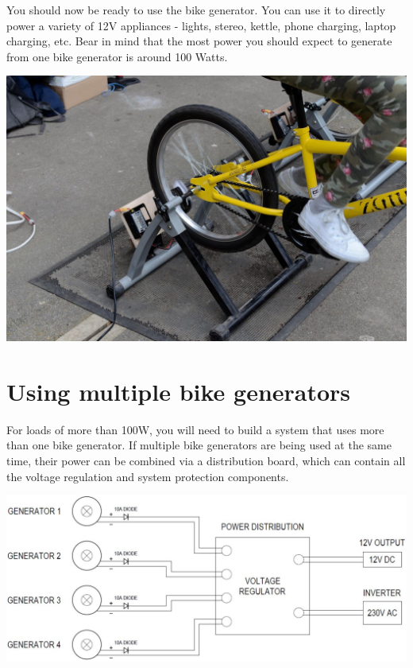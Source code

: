 \documentclass{article}
\theoremstyle{definition}
\theoremstyle{definition}
\theoremstyle{remark}
\begin{document}
  You should now be ready to use the bike generator. You can use it to directly power a variety of 12V appliances - lights, stereo, kettle, phone charging, laptop charging, etc. Bear in mind that the most power you should expect to generate from one bike generator is around 100 Watts.

  \begin{center}
    \includegraphics[width=0.45\paperwidth]{../Images/image_4_4_(generator_for_use).png}
  \end{center}


\section{Using multiple bike generators} %
\label{sec:using_multiple_bike_generators}

  For loads of more than 100W, you will need to build a system that uses more than one bike generator. If multiple bike generators are being used at the same time, their power can be combined via a distribution board, which can contain all the voltage regulation and system protection components. 

  \begin{center}
    \includegraphics[width=0.75\paperwidth]{Images/image_5_1_(multiple_generator_diagram).png}
  \end{center}
\end{document}
